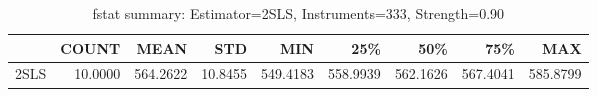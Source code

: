 \begin{table}[ht]
\centering
\caption{fstat summary: Estimator=2SLS, Instruments=333, Strength=0.90}
\begin{tabular}{lrrrrrrrr}
\toprule
 & COUNT & MEAN & STD & MIN & 25\% & 50\% & 75\% & MAX \\
\midrule
2SLS & 10.0000 & 564.2622 & 10.8455 & 549.4183 & 558.9939 & 562.1626 & 567.4041 & 585.8799 \\
\bottomrule
\end{tabular}
\end{table}

